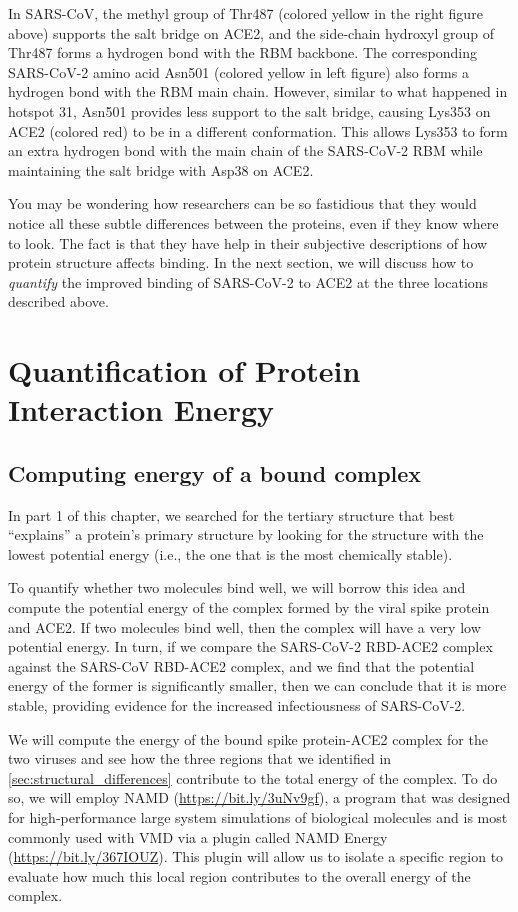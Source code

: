 In SARS-CoV, the methyl group of Thr487 (colored yellow in the right figure above) supports the salt bridge on ACE2, and the side-chain hydroxyl group of Thr487 forms a hydrogen bond with the RBM backbone. The corresponding SARS-CoV-2 amino acid Asn501 (colored yellow in left figure) also forms a hydrogen bond with the RBM main chain. However, similar to what happened in hotspot 31, Asn501 provides less support to the salt bridge, causing Lys353 on ACE2 (colored red) to be in a different conformation. This allows Lys353 to form an extra hydrogen bond with the main chain of the SARS-CoV-2 RBM while maintaining the salt bridge with Asp38 on ACE2.

You may be wondering how researchers can be so fastidious that they would notice all these subtle differences between the proteins, even if they know where to look. The fact is that they have help in their subjective descriptions of how protein structure affects binding. In the next section, we will discuss how to \textit{quantify} the improved binding of SARS-CoV-2 to ACE2 at the three locations described above.

\FloatBarrier
{}

\section{Quantification of Protein Interaction Energy}
\label{sec:interaction_energy}
\subsection{Computing energy of a bound complex}

In part 1 of this chapter, we searched for the tertiary structure that best ``explains'' a protein's primary structure by looking for the structure with the lowest potential energy (i.e., the one that is the most chemically stable).

To quantify whether two molecules bind well, we will borrow this idea and compute the potential energy of the complex formed by the viral spike protein and ACE2. If two molecules bind well, then the complex will have a very low potential energy. In turn, if we compare the SARS-CoV-2 RBD-ACE2 complex against the SARS-CoV RBD-ACE2 complex, and we find that the potential energy of the former is significantly smaller, then we can conclude that it is more stable, providing evidence for the increased infectiousness of SARS-CoV-2.

We will compute the energy of the bound spike protein-ACE2 complex for the two viruses and see how the three regions that we identified in \autoref{sec:structural_differences} contribute to the total energy of the complex. To do so, we will employ NAMD (\url{https://bit.ly/3uNv9gf}), a program that was designed for high-performance large system simulations of biological molecules and is most commonly used with VMD via a plugin called NAMD Energy (\url{https://bit.ly/367IOUZ}). This plugin will allow us to isolate a specific region to evaluate how much this local region contributes to the overall energy of the complex. 

